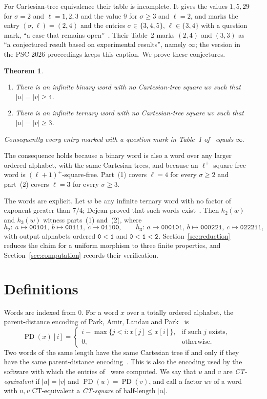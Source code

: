 \documentclass[11pt]{amsart}
\newtheorem{theorem}{Theorem}[section]
\theoremstyle{definition}
\theoremstyle{remark}
\newcommand{\PD}{\operatorname{PD}}
\newcommand{\tw}{\mathtt}
\begin{document}
For Cartesian-tree equivalence their table is incomplete. It gives the values $1,5,29$ for $\sigma=2$ and $\ell=1,2,3$ and the value $9$ for $\sigma\ge3$ and $\ell=2$, and marks the entry $(\sigma,\ell)=(2,4)$ and the entries $\sigma\in\{3,4,5\}$, $\ell\in\{3,4\}$ with a question mark, ``a case that remains open''~\cite[Table~1]{SMKI2026}. Their Table~2 marks $(2,4)$ and $(3,3)$ as ``a conjectured result based on experimental results'', namely $\infty$; the version in the PSC 2026 proceedings keeps this caption. We prove these conjectures.

\begin{theorem}\label{thm:main}
\begin{enumerate}
\item There is an infinite binary word with no Cartesian-tree square $uv$ such that $|u|=|v|\ge4$.
\item There is an infinite ternary word with no Cartesian-tree square $uv$ such that $|u|=|v|\ge3$.
\end{enumerate}
Consequently every entry marked with a question mark in Table~1 of~\cite{SMKI2026} equals $\infty$.
\end{theorem}

The consequence holds because a binary word is also a word over any larger ordered alphabet, with the same Cartesian trees, and because an $\ell^+$-square-free word is $(\ell+1)^+$-square-free. Part~(1) covers $\ell=4$ for every $\sigma\ge2$ and part~(2) covers $\ell=3$ for every $\sigma\ge3$.

The words are explicit. Let $w$ be any infinite ternary word with no factor of exponent greater than $7/4$; Dejean proved that such words exist~\cite{Dejean1972}. Then $h_2(w)$ and $h_3(w)$ witness parts~(1) and~(2), where
\[
h_2:\ a\mapsto\tw{00101},\ b\mapsto\tw{00111},\ c\mapsto\tw{01100},\qquad
h_3:\ a\mapsto\tw{000101},\ b\mapsto\tw{000221},\ c\mapsto\tw{022211},
\]
with output alphabets ordered $\tw0<\tw1$ and $\tw0<\tw1<\tw2$. Section~\ref{sec:reduction} reduces the claim for a uniform morphism to three finite properties, and Section~\ref{sec:computation} records their verification.

\section{Definitions}

Words are indexed from $0$. For a word $x$ over a totally ordered alphabet, the parent-distance encoding of Park, Amir, Landau and Park~\cite[Definition~2]{PALP2019} is
\[
\PD(x)[i]=\begin{cases} i-\max\{j<i : x[j]\le x[i]\}, & \text{if such } j \text{ exists},\\ 0, & \text{otherwise.}\end{cases}
\]
Two words of the same length have the same Cartesian tree if and only if they have the same parent-distance encoding~\cite{PALP2019}. This is also the encoding used by the software with which the entries of~\cite[Table~1]{SMKI2026} were computed. We say that $u$ and $v$ are \emph{CT-equivalent} if $|u|=|v|$ and $\PD(u)=\PD(v)$, and call a factor $uv$ of a word with $u,v$ CT-equivalent a \emph{CT-square} of half-length $|u|$.
\end{document}
